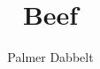 \documentclass{article}
\author{Palmer Dabbelt}
\title{Beef}
\begin{document}
\maketitle
\tableofcontents
\contentsskip


\end{document}
